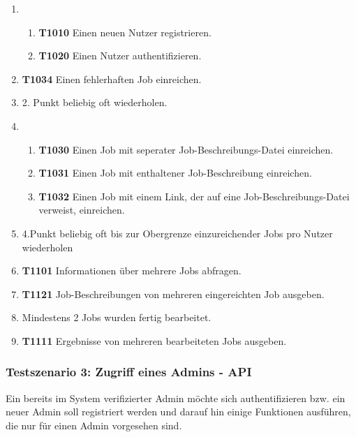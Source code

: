 \begin{enumerate}
    \item 
    \begin{enumerate}
        \item \textbf{T1010} Einen neuen Nutzer registrieren.
        
        \item \textbf{T1020} Einen Nutzer authentifizieren.
    \end{enumerate}
    
    \item \textbf{T1034} Einen fehlerhaften Job einreichen.
    
    \item 2. Punkt beliebig oft wiederholen.
    
    \item 
    \begin{enumerate}
        \item \textbf{T1030} Einen Job mit seperater Job-Beschreibungs-Datei einreichen. 
        
        \item \textbf{T1031} Einen Job mit enthaltener Job-Beschreibung einreichen.
        
        \item \textbf{T1032} Einen Job mit einem Link, der auf eine Job-Beschreibungs-Datei verweist, einreichen.
    \end{enumerate}
    
    \item 4.Punkt beliebig oft bis zur Obergrenze einzureichender Jobs pro Nutzer wiederholen
    
    \item \textbf{T1101} Informationen über mehrere Jobs abfragen. 
    
    \item \textbf{T1121} Job-Beschreibungen von mehreren eingereichten Job ausgeben.
    
    \item Mindestens 2 Jobs wurden fertig bearbeitet.
    
    \item \textbf{T1111} Ergebnisse von mehreren bearbeiteten Jobs ausgeben. 
\end{enumerate}

\subsubsection{Testszenario 3: Zugriff eines Admins - API}
Ein bereits im System verifizierter Admin möchte sich authentifizieren bzw. ein neuer Admin soll registriert werden und darauf hin einige Funktionen ausführen, die nur für einen Admin vorgesehen sind.


